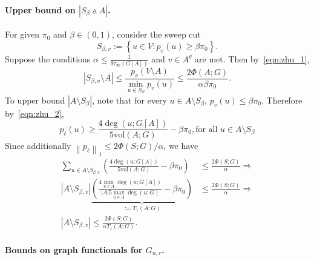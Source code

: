 \documentclass[11pt,twoside]{article}
\newcommand{\set}[1]{\left\{#1\right\}}
\newcommand{\vol}{\mathrm{vol}}
\newcommand{\abs}[1]{\left \lvert #1 \right \rvert}
\newcommand{\norm}[1]{\left\lVert#1\right\rVert}
\newcommand{\1}{\mathbbm{1}}
\begin{document}
\paragraph{Upper bound on $\abs{S_{\beta} \vartriangle A}$.}

For given $\pi_0$ and $\beta \in (0,1)$, consider the sweep cut
\begin{equation*}
S_{\beta,v} := \set{u \in V: p_v(u) \geq \beta \pi_0}.
\end{equation*}
Suppose the conditions $\alpha \leq \frac{1}{9\tau_{\infty}(G[A])}$ and $v \in A^g$ are met. Then by~\eqref{eqn:zhu_1},
\begin{equation}
\label{eqn:zhu_3}
\abs{S_{\beta,v} \setminus A} \leq \frac{p_v(V \setminus A)}{\min_{u \in S_{\beta}}p_v(u)} \leq \frac{2 \Phi(A;G)}{\alpha \beta \pi_0}. 
\end{equation}
To upper bound $\abs{A \setminus S_{\beta}}$, note that for every $u \in A \setminus S_{\beta}$, $p_v(u) \leq \beta \pi_0$. Therefore by~\eqref{eqn:zhu_2},
\begin{equation*}
p_{\ell}(u) \geq \frac{4\deg(u;G[A])}{5\vol(A;G)} - \beta\pi_0, \textrm{for all $u \in A \setminus S_{\beta}$}
\end{equation*}
Since additionally $\norm{p_{\ell}}_1 \leq 2\Phi(S;G)/\alpha$, we have
\begin{align}
\sum_{u \in A \setminus S_{\beta,v}} \left(\frac{4\deg(u;G[A])}{5\vol(A;G)} - \beta\pi_0\right) & \leq \frac{2\Phi(S;G)}{\alpha} \nonumber \Longrightarrow\\
\abs{A \setminus S_{\beta,v}}\underbrace{\left(\frac{4\min_{u \in A}\deg(u;G[A])}{\abs{A}5\max_{u \in A}\deg(u;G)} - \beta\pi_0\right)}_{:=T_1(A;G)} & \leq \frac{2\Phi(S;G)}{\alpha} \Longrightarrow \nonumber \\
\abs{A \setminus S_{\beta,v}} \leq \frac{2\Phi(S;G)}{\alpha T_1(A;G)} .
\label{eqn:zhu_4}
\end{align}

\paragraph{Bounds on graph functionals for $G_{n,r}$.}
\end{document}
